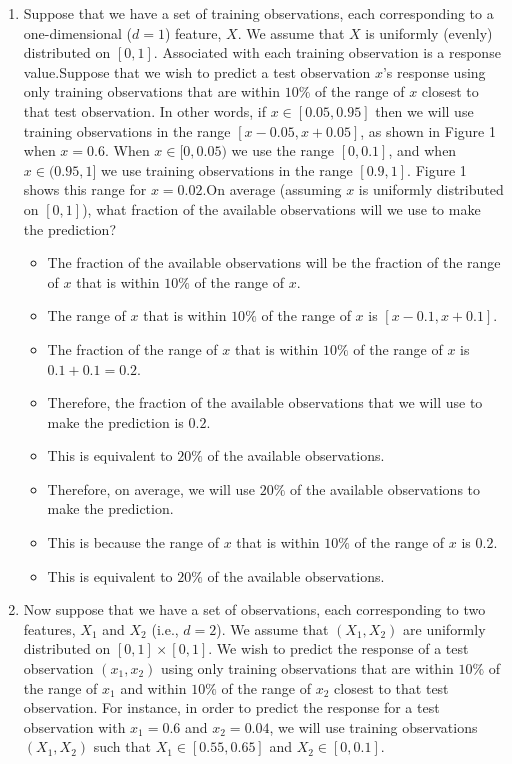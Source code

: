 \documentclass[a3paper,12pt]{extarticle} %
\begin{document}
\begin{enumerate}
    \item Suppose that we have a set of training observations, each corresponding to a one-dimensional ($d = 1$) feature, $X$. We assume that $X$ is uniformly (evenly) distributed on $[0, 1]$. Associated with each training observation is a response value.Suppose that we wish to predict a test observation $x$'s response using only training observations that are within $10\%$ of the range of $x$ closest to that test observation. In other words, if $x \in [0.05, 0.95]$ then we will use training observations in the range $[x - 0.05, x + 0.05]$, as shown in Figure 1 when $x = 0.6$. When $x \in [0, 0.05)$ we use the range $[0, 0.1]$, and when $x \in (0.95, 1]$ we use training observations in the range $[0.9, 1]$. Figure 1 shows this range for $x = 0.02$.On average (assuming $x$ is uniformly distributed on $[0, 1]$), what fraction of the available observations will we use to make the prediction?
    \begin{itemize}
        \item The fraction of the available observations will be the fraction of the range of $x$ that is within $10\%$ of the range of $x$.
        \item The range of $x$ that is within $10\%$ of the range of $x$ is $[x - 0.1, x + 0.1]$. 
        \item The fraction of the range of $x$ that is within $10\%$ of the range of $x$ is $0.1 + 0.1 = 0.2$.
        \item Therefore, the fraction of the available observations that we will use to make the prediction is $0.2$.
        \item This is equivalent to $20\%$ of the available observations.
        \item Therefore, on average, we will use $20\%$ of the available observations to make the prediction.
        \item This is because the range of $x$ that is within $10\%$ of the range of $x$ is $0.2$.
        \item This is equivalent to $20\%$ of the available observations.
    \end{itemize}
    \item Now suppose that we have a set of observations, each corresponding to two features, $X_1$ and $X_2$ (i.e., $d = 2$). We assume that $(X_1, X_2)$ are uniformly distributed on $[0, 1] \times [0, 1]$. We wish to predict the response of a test observation $(x_1, x_2)$ using only training observations that are within $10\%$ of the range of $x_1$ and within $10\%$ of the range of $x_2$ closest to that test observation. For instance, in order to predict the response for a test observation with $x_1 = 0.6$ and $x_2 = 0.04$, we will use training observations $(X_1, X_2)$ such that $X_1 \in [0.55, 0.65]$ and $X_2 \in [0, 0.1]$.

\end{enumerate}
\end{document}
